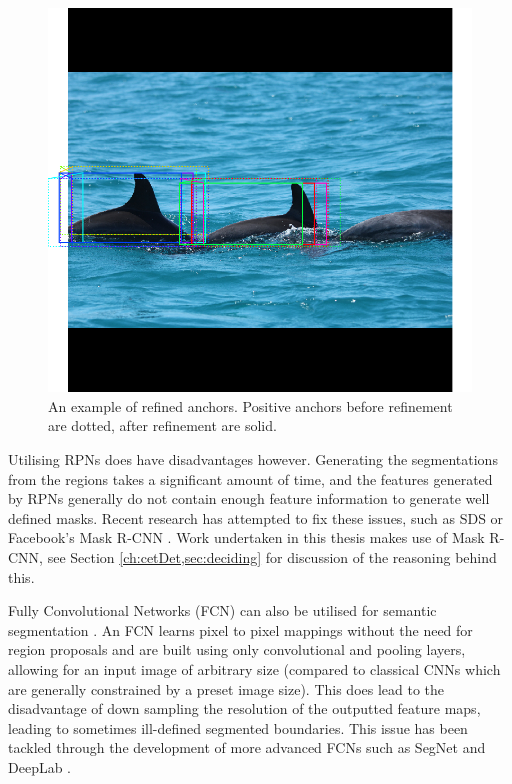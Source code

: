 \begin{figure}
	\begin{center}
		\includegraphics[scale=0.3]{Chapter2/figs/rpn-refined.png}
	\end{center}
	\caption[An example of refined anchors.]{An example of refined anchors. Positive anchors before refinement are dotted, after refinement are solid.}
	\label{fig:rpn-refined}
\end{figure}

Utilising RPNs does have disadvantages however. Generating the segmentations from the regions takes a significant amount of time, and the features generated by RPNs generally do not contain enough feature information to generate well defined masks. Recent research has attempted to fix these issues, such as SDS \cite{hariharan_simultaneous_2014} or Facebook's Mask R-CNN \cite{he_mask_2017}. Work undertaken in this thesis makes use of Mask R-CNN, see Section \ref{ch:cetDet,sec:deciding} for discussion of the reasoning behind this.

Fully Convolutional Networks (FCN) can also be utilised for semantic segmentation \cite{long_fully_2014}. An FCN learns pixel to pixel mappings without the need for region proposals and are built using only convolutional and pooling layers, allowing for an input image of arbitrary size (compared to classical CNNs which are generally constrained by a preset image size). This does lead to the disadvantage of down sampling the resolution of the outputted feature maps, leading to sometimes ill-defined segmented boundaries. This issue has been tackled through the development of more advanced FCNs such as SegNet \cite{badrinarayanan_segnet:_2015} and DeepLab \cite{chen_semantic_2014}. 


